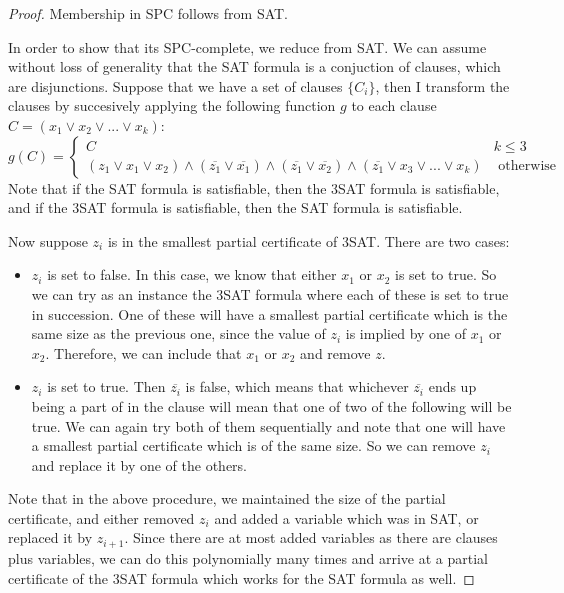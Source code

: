\documentclass[runningheads,a4paper]{llncs}
\begin{document}
\begin{proof}
Membership in SPC follows from SAT. 

In order to show that its SPC-complete, we reduce from SAT. We can assume without loss of generality that the SAT formula is a conjuction of clauses, which are disjunctions. Suppose that we have a set of clauses $\{ C_i \}$, then I transform the clauses by succesively applying the following function $g$ to each clause $C = (x_1 \vee x_2 \vee ... \vee x_k)$:
\[ g(C) = \left\{ \begin{array}{cc} C & k \leq 3 \\
						    (z_1 \vee x_1 \vee x_2) \wedge (\overline{z_1} \vee \overline{x_1}) \wedge (\overline{z_1} \vee \overline{x_2}) \wedge (\overline{z_1} \vee x_3 \vee ... \vee x_k) & \text{ otherwise }\end{array} \right. \] 
Note that if the SAT formula is satisfiable, then the 3SAT formula is satisfiable, and if the 3SAT formula is satisfiable, then the SAT formula is satisfiable. 

Now suppose $z_i$ is in the smallest partial certificate of 3SAT. There are two cases:
\begin{itemize}
\item $z_i$ is set to false. In this case, we know that either $x_1$ or $x_2$ is set to true. So we can try as an instance the 3SAT formula where each of these is set to true in succession. One of these will have a smallest partial certificate which is the same size as the previous one, since the value of $z_i$ is implied by one of $x_1$ or $x_2$. Therefore, we can include that $x_1$ or $x_2$ and remove $z$.
\item $z_i$ is set to true. Then $\overline{z_i}$ is false, which means that whichever $\overline{z_i}$ ends up being a part of in the clause will mean that one of two of the following will be true. We can again try both of them sequentially and note that one will have a smallest partial certificate which is of the same size. So we can remove $z_i$ and replace it by one of the others. 
\end{itemize}
Note that in the above procedure, we maintained the size of the partial certificate, and either removed $z_i$ and added a variable which was in SAT, or replaced it by $z_{i+1}$. Since there are at most added variables as there are clauses plus variables, we can do this polynomially many times and arrive at a partial certificate of the 3SAT formula which works for the SAT formula as well.
\end{proof}



\end{document}
